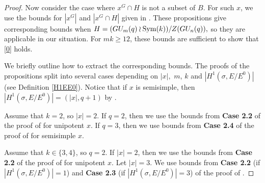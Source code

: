 \begin{proof}
\medskip
Now consider the case where $x^G \cap H$ is not a subset of $B$. For such $x$, we use the bounds for $|x^G|$ and $|x^G \cap H|$ given in \cite[Propositions 2.5 and 2.6]{fpr3}. These propositions give corresponding bounds when $H=(GU_m(q) \wr \mathrm{Sym}(k))/Z(GU_n(q)),$ so they are applicable in our situation. For $mk \ge 12$, these bounds  are sufficient to show that \eqref{0} holds. 

We briefly outline how to extract the corresponding bounds. The proofs of the propositions split into several cases depending on $|x|,$ $m$, $k$ and 
$|H^1(\sigma, E/E^0)|$ (see Definition \ref{H1EE0}). Notice that if $x$ is semisimple, then $|H^1(\sigma, E/E^0)|=(|x|,q+1)$ by \cite[Lemma 3.35]{fpr}. 


 Assume that $k=2$, so $|x|=2.$ If $q=2$, then we use the bounds from {\bf Case 2.2} of the proof of  \cite[Proposition 2.6]{fpr3} for unipotent $x$. 
If $q=3$, then we use bounds from {\bf Case 2.4} of the proof of  \cite[Proposition 2.5]{fpr3} for semisimple $x.$

Assume that $k \in \{3,4\}$, so $q=2.$ If $|x|=2$, then we use the bounds from {\bf Case 2.2} of the proof of  \cite[Proposition 2.6]{fpr3} for unipotent $x$. 
Let  $|x|=3$. We use bounds  from {\bf Case 2.2} (if $|H^1(\sigma, E/E^0)|=1$) and {\bf Case 2.3} (if $|H^1(\sigma, E/E^0)|=3$)  of the proof of  \cite[Proposition 2.5]{fpr3}. 
\end{proof}

